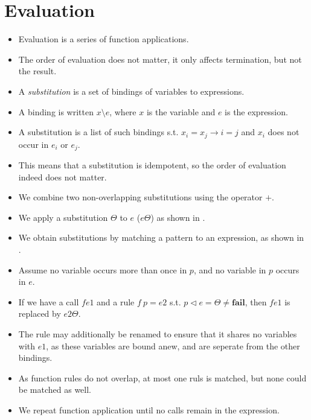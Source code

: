 \section{Evaluation}

\begin{itemize}

\item Evaluation is a series of function applications.

\item The order of evaluation does not matter, it only affects termination, but
not the result.

\item A \emph{substitution} is a set of bindings of variables to expressions.

\item A binding is written $x\setminus e$, where $x$ is the variable and $e$ is
the expression.

\item A substitution is a list of such bindings s.t. $x_i = x_j \rightarrow i =
j$ and $x_i$ does not occur in $e_i$ or $e_j$. 

\item This means that a substitution is idempotent, so the order of evaluation
indeed does not matter.

\item We combine two non-overlapping substitutions using the operator $+$.

\item We apply a substitution $\Theta$ to $e$ ($e\Theta$) as shown in
.


\item We obtain substitutions by matching a pattern to an expression, as shown
in .


\item Assume no variable occurs more than once in $p$, and no variable in $p$
occurs in $e$.

\item If we have a call $f e1$ and a rule $f\ p = e2$ s.t. $p\lhd
e=\Theta\neq\mathbf{fail}$, then $f e1$ is replaced by $e2\Theta$.

\item The rule may additionally be renamed to ensure that it shares no
variables with $e1$, as these variables are bound anew, and are seperate from
the other bindings.

\item As function rules do not overlap, at most one ruls is matched, but none
could be matched as well.

\item We repeat function application until no calls remain in the expression.

\end{itemize}

